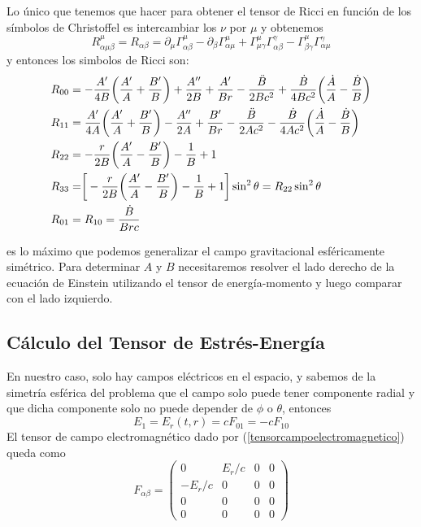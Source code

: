 Lo único que tenemos que hacer para obtener el tensor de Ricci en función de los símbolos de Christoffel es intercambiar los $\nu$ por $\mu$ y obtenemos
\begin{equation}
R^\mu_{\alpha \mu \beta}= R_{\alpha\beta}= \partial_{\mu}\Gamma^{\mu}_{\alpha \beta}-\partial_{\beta}\Gamma^{\mu}_{\alpha\mu}+\Gamma^{\mu}_{\mu\gamma}\Gamma^{\gamma}_{\alpha\beta}-\Gamma^{\mu}_{\beta\gamma}\Gamma^{\gamma}_{\alpha\mu}    
\end{equation}
y entonces los simbolos de Ricci son:
\begin{equation}
\begin{split}
R_{00} &= -\frac{A'}{4B}\biggr(\frac{A'}{A}+\frac{B'}{B}\biggr)+\frac{A''}{2B}+\frac{A'}{Br}-\frac{\Ddot{B}}{2Bc^2}+\frac{\dot{B}}{4Bc^2}\biggr(\frac{\dot{A}}{A}-\frac{\dot{B}}{B}\biggr) \\
R_{11} &= \frac{A'}{4A}\biggr(\frac{A'}{A}+\frac{B'}{B}\biggr)-\frac{A''}{2A}+\frac{B'}{Br}-\frac{\Ddot{B}}{2Ac^2}-\frac{\dot{B}}{4Ac^2}\biggr(\frac{\dot{A}}{A}-\frac{\dot{B}}{B}\biggr) \\
R_{22} &= -\frac{r}{2B}\biggr(\frac{A'}{A}-\frac{B'}{B}\biggr)-\frac{1}{B}+ 1 \\
R_{33} &= \biggr[-\frac{r}{2B}\biggr(\frac{A'}{A}-\frac{B'}{B}\biggr)-\frac{1}{B}+ 1 \biggr]\sin^2{\theta} = R_{22}\sin^2{\theta}\\
R_{01} &= R_{10} = \frac{\dot{B}}{Brc} \\
\end{split}
\end{equation}

 es lo máximo que podemos generalizar el campo gravitacional esféricamente simétrico. Para determinar $A$ y $B$ necesitaremos resolver el lado derecho de la ecuación de Einstein utilizando el tensor de energía-momento y luego comparar con el lado izquierdo. 

\subsection*{\textbf{Cálculo del Tensor de Estrés-Energía}}
En nuestro caso, solo hay campos eléctricos en el espacio, y sabemos de la simetría esférica del problema que el campo solo puede tener componente radial y que dicha componente solo no puede depender de $\phi$ o $\theta$, entonces
\begin{equation}
    E_1=E_r(t,r)=cF_{01}=-cF_{10}
\end{equation}
El tensor de campo electromagnético dado por (\ref{tensorcampoelectromagnetico}) queda como
\begin{equation}
    F_{\alpha\beta}=
    \begin{pmatrix}
    0 & E_r/c & 0 & 0\\
    -E_r/c & 0 & 0 & 0\\
    0 & 0 & 0 & 0\\
    0 & 0 & 0 & 0
    \end{pmatrix}
\end{equation}

